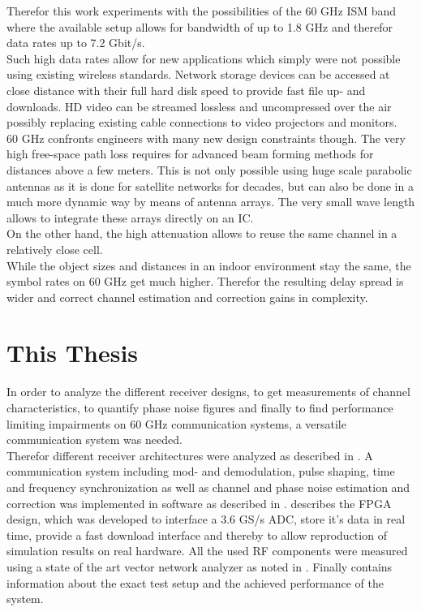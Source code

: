 Therefor this work experiments with the possibilities of the 60 GHz
\gls{ISM} band where the available setup allows for bandwidth of up to
1.8 GHz and therefor data rates up to 7.2 Gbit/s. \\

Such high data rates allow for new applications which simply were not possible
using existing wireless standards. Network storage devices can be accessed
at close distance with their full hard disk speed to provide fast file
up- and downloads. \gls{HD} video can be streamed lossless and uncompressed
over the air possibly replacing existing cable connections to video
projectors and monitors. \\

60 GHz confronts engineers with many new design constraints though. The very
high free-space path loss requires for advanced beam forming methods
for distances above a few meters.
This is not only possible using huge scale parabolic
antennas as it is done for satellite networks for decades, but can also
be done in a much more dynamic way by means of antenna arrays.
The very small wave length allows to integrate these arrays
directly on an \gls{IC}. \\

On the other hand, the high attenuation allows to reuse the same channel
in a relatively close cell. \\

While the object sizes and distances in an indoor environment stay the same,
the symbol rates on 60 GHz get much higher. Therefor the resulting
delay spread is wider and correct channel estimation and correction
gains in complexity.  \\

\section{This Thesis}
In order to analyze the different receiver designs,
to get measurements of channel characteristics,
to quantify phase noise figures and finally to find
performance limiting impairments on 60 GHz communication
systems, a versatile communication system was needed. \\

Therefor different receiver architectures were analyzed as described in
. A communication system including mod- and demodulation,
pulse shaping, time and frequency synchronization as well as channel and phase noise
estimation and correction was implemented in software as described in
.
 describes the \gls{FPGA} design, which was developed
to interface a 3.6 GS/s \gls{ADC},
store it's data in real time, provide a fast download interface and thereby
to allow reproduction of simulation results on real hardware.
All the used \gls{RF} components were measured using a state of the art
vector network analyzer as noted in .
Finally  contains information
about the exact test setup and the achieved performance of the system. \\

